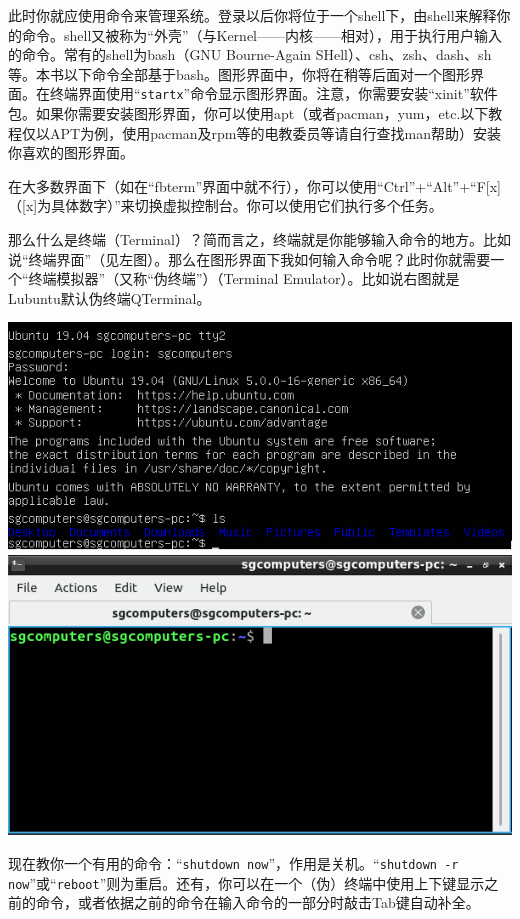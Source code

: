 此时你就应使用命令来管理系统。登录以后你将位于一个shell下，由shell来解释你的命令。shell又被称为“外壳”（与Kernel——内核——相对），用于执行用户输入的命令。常有的shell为bash（GNU Bourne-Again SHell）、csh、zsh、dash、sh等。本书以下命令全部基于bash。图形界面中，你将在稍等后面对一个图形界面。在终端界面使用“\verb|startx|”命令显示图形界面。注意，你需要安装“xinit”软件包。如果你需要安装图形界面，你可以使用apt（或者pacman，yum，etc.以下教程仅以APT为例，使用pacman及rpm等的电教委员等请自行查找man帮助）安装你喜欢的图形界面。\par
在大多数界面下（如在“fbterm”界面中就不行），你可以使用“Ctrl”+“Alt”+“F[x]（[x]为具体数字）”来切换虚拟控制台。你可以使用它们执行多个任务。\par
那么什么是终端（Terminal）？简而言之，终端就是你能够输入命令的地方。比如说“终端界面”（见左图）。那么在图形界面下我如何输入命令呢？此时你就需要一个“终端模拟器”（又称“伪终端”）（Terminal Emulator）。比如说右图就是Lubuntu默认伪终端QTerminal。
\begin{center}
	\includegraphics[width=0.7\linewidth]{pic/term1} \includegraphics[width=0.7\linewidth]{pic/term2}
\end{center} \par
现在教你一个有用的命令：“\verb|shutdown now|”，作用是关机。“\verb|shutdown -r now|”或“\verb|reboot|”则为重启。还有，你可以在一个（伪）终端中使用上下键显示之前的命令，或者依据之前的命令在输入命令的一部分时敲击Tab键自动补全。
